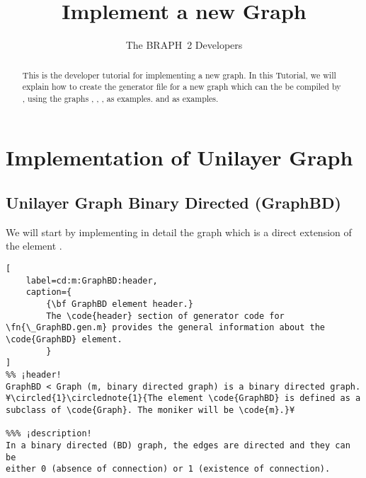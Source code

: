 \documentclass{tufte-handout}
\title{Implement a new Graph}
\author[The BRAPH~2 Developers]{The BRAPH~2 Developers}
\begin{document}
\maketitle

\begin{abstract}
\noindent
This is the developer tutorial for implementing a new graph. 
In this Tutorial, we will explain how to create the generator file  for a new graph which can the be compiled by , using the graphs , , ,  as examples. and  as examples.
\end{abstract}

\tableofcontents

\clearpage
\section{Implementation of Unilayer Graph}

\subsection{Unilayer Graph Binary Directed (GraphBD)}

We will start by implementing in detail the graph  which  is a direct extension of the element .

\begin{lstlisting}[
	label=cd:m:GraphBD:header,
	caption={
		{\bf GraphBD element header.}
		The \code{header} section of generator code for \fn{\_GraphBD.gen.m} provides the general information about the \code{GraphBD} element.
		}
]
%% ¡header!
GraphBD < Graph (m, binary directed graph) is a binary directed graph. ¥\circled{1}\circlednote{1}{The element \code{GraphBD} is defined as a subclass of \code{Graph}. The moniker will be \code{m}.}¥

%%% ¡description!
In a binary directed (BD) graph, the edges are directed and they can be 
either 0 (absence of connection) or 1 (existence of connection).
\end{lstlisting}
\end{document}
